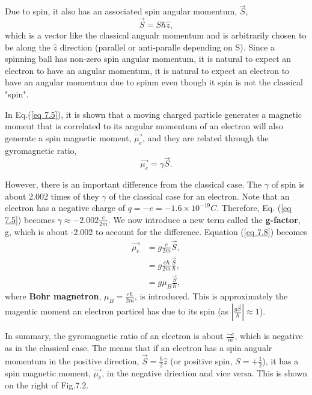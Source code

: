 \documentclass{article}
\begin{document}
Due to spin, it also has an associated spin angular momentum, $\vec{S}$,
\begin{equation}\label{eq 7.7}
    \vec{S}=S\hbar\hat{z}, \tag{7.7}
\end{equation}
which is a vector like the classical angualr momentum and is arbitrarily chosen to be along 
the $\hat{z}$ direction (parallel or anti-paralle depending on S). Since a spinning ball has
non-zero spin angular momentum, it is natural to expect an electron to have an angular momentum,
it is natural to expect an electron to have an angular momentum due to spinm even
though it spin is not the classical "spin".

In Eq.(\ref{eq 7.5}), it is shown that a moving charged particle generates a magnetic
moment that is correlated to its angular momentum of an electron will also generate a spin
magnetic moment, $\vec{\mu_e}$, and they are related through the gyromagnetic ratio,
\begin{equation}\label{eq 7.8}
    \vec{\mu_e}=\gamma\vec{S}. \tag{7.8}
\end{equation}

However, there is an important difference from the classical case. The $\gamma$ of spin
is about 2.002 times of they $\gamma$ of the classical case for an electron. Note that an electron
has a negative charge of $q=-e=-1.6\times10^{-19}C$. Therefore, Eq. (\ref{eq 7.5}) becomes
$\gamma\approx -2.002\frac{e}{2m}$. We now introduce a new term called the \textbf{g-factor}, 
g, which is about -2.002 to account for the difference. Equation (\ref{eq 7.8}) becomes
\begin{align*}\label{eq 7.9}
    \vec{\mu_e}&=g\frac{e}{2m}\vec{S},\\
    &=g\frac{e\hbar}{2m}\frac{\vec{S}}{\hbar},\\
    &=g\mu_B\frac{\vec{S}}{\hbar}, \tag{7.9}
\end{align*}
where \textbf{Bohr magnetron}, $\mu_B=\frac{e\hbar}{2m}$, is introduced. This is approximately
the magentic moment an electron particel has due to its spin (as $|\frac{g\vec{S}}{\hbar}|\approx 1$).

In summary, the gyromagnetic ratio of an electron is about $\frac{-e}{m}$, which is negative
as in the classical case. The means that if an electron has a spin angualr momentum in the positive
direction, $\vec{S}=\frac{\hbar}{2}\hat{z}$ (or positive spin, $S= +\frac{1}{2}$), it has a spin magnetic moment,
$\vec{\mu_e}$, in the negative driection and vice versa. This is shown on the right of Fig.7.2.\\
\end{document}

